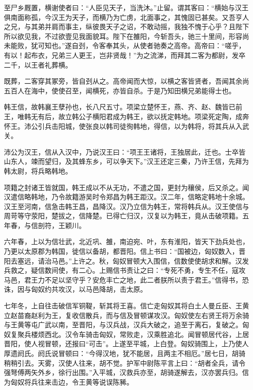 \documentclass[]{article}
\begin{document}
至尸乡厩置，横谢使者曰：``人臣见天子，当洗沐。''止留。谓其客曰：``横始与汉王俱南面称孤，今汉王为天子，而横乃为亡虏，北面事之，其愧固已甚矣。又吾亨人之兄，与其弟并肩而事主，纵彼畏天子之诏，不敢动摇，我独不愧于心乎？且陛下所以欲见我，不过欲壹见我面貌耳。陛下在雒阳，今斩吾头，驰三十里间，形容尚未能败，犹可知也。''遂自刭，令客奉其头，从使者驰奏之高帝。高帝曰：``嗟乎，有以！起布衣，兄弟三人更王，岂非贤哉！''为之流涕，而拜其二客为都尉，发卒二千，以王者礼葬横。

既葬，二客穿其冢旁，皆自刭从之。高帝闻而大惊，以横之客皆贤者，吾闻其余尚五百人在海中，使使召至，闻横死，亦皆自杀。于是乃知田横兄弟能得士也。

韩王信，故韩襄王孽孙也，长八尺五寸。项梁立楚怀王，燕、齐、赵、魏皆已前王，唯韩无有后，故立韩公子横阳君成为韩王，欲以抚定韩地。项梁死定陶，成奔怀王。沛公引兵击阳城，使张良以韩司徒徇韩地，得信，以为韩将，将其兵从入武关。

沛公为汉王，信从入汉中，乃说汉王曰：``项王王诸将，王独居此，迁也。士卒皆山东人，竦而望归，及其蜂东乡，可以争天下。''汉王还定三秦，乃许王信，先拜为韩太尉，将兵略韩地。

项籍之封诸王皆就国，韩王成以不从无功，不遣之国，更封为穰侯，后又杀之。闻汉遣信略韩地，乃令故籍游吴时令郑昌为韩王距汉。汉二年，信略定韩地十余城。汉王至河南，信急击韩王昌，昌降汉。汉乃立信为韩王，常将韩兵从。汉王使信与周苛等守荥阳，楚拔之，信降楚。已得亡归汉，汉复以为韩王，竟从击破项籍。五年春，与信剖符，王颖川。

六年春，上以为信壮武，北近巩、雒，南迫宛、叶，东有淮阳，皆天下劲兵处也，乃更以太原郡为韩国，徙信以备胡，都晋阳。信上书曰：``国被边，匈奴数入，晋阳去塞远，请治马邑。''上许之。秋，匈奴冒顿大入围信，信数使使胡求和解。汉发兵救之，疑信数间使，有二心。上赐信书责让之曰：``专死不勇，专生不任，寇攻马邑，君王力不足以坚守乎？安危丰亡之地，此二者朕所以责于君王。''信得书，恐诛，因与匈奴约共攻汉，以马邑降胡，击太原。

七年冬，上自往击破信军铜鞮，斩其将王喜。信亡走匈奴其将白土人曼丘臣、王黄立赵苗裔赵利为王，复收信散兵，而与信及冒顿谋攻汉。匈奴使左右贤王将万余骑与王黄等屯广武以南，至晋阳，与汉兵战，汉兵大破之，追至于离石，复破之。匈奴复聚兵楼烦西北。汉令车骑击匈奴，常败走，汉乘胜追北。闻冒顿居代谷，上居晋阳，使人视冒顿，还报曰``可击''。上遂至平城，上白登。匈奴骑围上，上乃使人厚遗阏氏。阏氏说冒顿曰：``今得汉地，犹不能居，且两主不相厄。''居七日，胡骑稍稍引去。天雾，汉使人往来，胡不觉。护军中尉陈平言上曰：``胡者全兵，请令强弩傅两矢外乡，徐行出围。''入平城，汉救兵亦至，胡骑遂解去，汉亦罢兵归。信为匈奴将兵往来击边，令王黄等说误陈豨。
\end{document}
